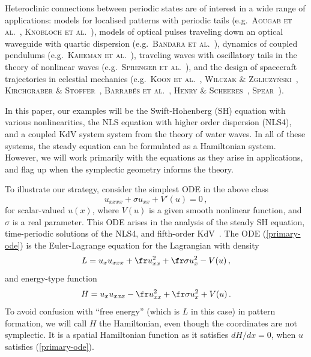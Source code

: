 \documentclass[10pt]{article}
\begin{document}
Heteroclinic connections between periodic states are of interest in a wide range
of applications: models for localised patterns with  periodic tails (e.g.\
\textsc{Aougab et al.}~\cite{abcdssw19}, \textsc{Knobloch et al.}~\cite{kuw19}),
models of optical pulses traveling down an optical waveguide with quartic
dispersion (e.g.\ \textsc{Bandara et al.}~\cite{bgbk21,bgbk23,bgbk25}), dynamics
of coupled pendulums (e.g.\ \textsc{Kaheman et al.}~\cite{Kaheman2023}),
traveling waves with oscillatory tails in the theory of nonlinear waves (e.g.\
\textsc{Sprenger et al.}~\cite{sbs23}), and the design of spacecraft
trajectories in celestial mechanics (e.g.\ \textsc{Koon et al.}~\cite{klmr00},
\textsc{Wilczak \& Zgliczy\'nski}~\cite{wz03,wz05}, \textsc{Kirchgraber \&
Stoffer}~\cite{ks04}, \textsc{Barrab\'es et al.}~\cite{bmo13}, \textsc{Henry \&
Scheeres}~\cite{hs22}, \textsc{Spear}~\cite{s21}).

In this paper, our examples will be the Swift-Hohenberg (SH) equation with
various nonlinearities, 
the NLS equation with higher order dispersion (NLS4), and a coupled KdV system
system from the theory of water waves. In all of these systems, the steady
equation can be formulated as a Hamiltonian system. However, we will work
primarily with the equations as they arise in applications, and flag up when the
symplectic geometry informs the theory.

To illustrate our strategy, consider the simplest ODE in the above class
%
\begin{equation}\label{primary-ode}
u_{xxxx} + \sigma u_{xx} + V'(u) = 0 \,,
\end{equation}
%
for scalar-valued $u(x)$, where $V(u)$ is a given smooth nonlinear function, and
$\sigma$ is a real parameter. This ODE arises in the analysis of the steady SH
equation, time-periodic solutions of the
NLS4, and fifth-order KdV~\cite{sbs23}.  The ODE (\ref{primary-ode}) is the Euler-Lagrange equation for the
Lagrangian with density
%
\begin{equation}\label{L-def}
L = u_xu_{xxx} + \fr u_{xx}^2 + \fr \sigma u_x^2 - V(u)\,,
\end{equation}
%
and energy-type function
%
\begin{equation}\label{H-def}
H = u_xu_{xxx} - \fr u_{xx}^2 + \fr \sigma u_x^2 + V(u)\,.
\end{equation}
%
To avoid confusion with ``free energy'' (which is $L$ in this case) in
pattern formation, we will call $H$ the Hamiltonian, even though the coordinates
are not symplectic. It is a spatial Hamiltonian function as it satisfies
$dH/dx=0$, when $u$ satisfies (\ref{primary-ode}).
\end{document}
